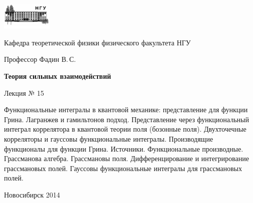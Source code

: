 \documentclass[12pt,pagesize,paper=192mm:108mm]{scrbook}
\begin{document}
\begin{titlepage}
  \vspace*{-1em}
  \begin{center}
    \includegraphics[width=0.18\textwidth]{../NSU-logo}

    Кафедра теоретической физики физического факультета НГУ
    \medskip

    \Large
    Профессор Фадин В.\,С.

    \huge
    \textbf{Теория сильных взаимодействий}
    \smallskip
    
    \Large
    Лекция № 15
    \vfill
    
    \normalsize
    \begin{minipage}{0.78\linewidth}
      Функциональные интегралы в квантовой механике: представление для
      функции Грина. Лагранжев и гамильтонов подход. Представление
      через функциональный интеграл коррелятора в квантовой теории
      поля (бозонные поля). Двухточечные корреляторы и гауссовы
      функциональные интегралы. Производящие функционалы для функции
      Грина. Источники. Функциональные производные. Грассманова
      алгебра. Грассмановы поля. Дифференцирование и интегрирование
      грассмановых полей. Гауссовы функциональные интегралы для
      грассмановых полей.
    \end{minipage}
    \vfill
    
    \normalsize \ccbysa\hspace{0.5em}  Новосибирск 2014   
  \end{center}
\end{titlepage}
\end{document}

